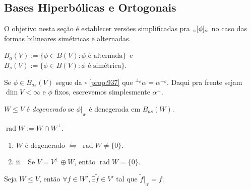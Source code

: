 \subsection{Bases Hiperbólicas e Ortogonais}

O objetivo nesta seção é establecer versões simplificadas pra \(\textcolor{gray}{_\alpha}[\phi]_\alpha\) no caso das formas bilineares simétricas e alternadas. 

\begin{definition}
    \(B_a(V):= \{\phi \in B(V): \phi \text{ é alternada}\}\)\  e \ \(B_s(V):= \{\phi \in B(V): \phi \text{ é simétrica}\}\). 
\end{definition}

\begin{note}
Se \(\phi \in B_{as}(V)\) segue da \(\square\) \ref{prop:937} que \(^{\perp_\phi}\alpha = \alpha^{\perp_\phi}\). Daqui pra frente sejam \(\dim V < \infty\) e \(\phi\) fixos, escrevemos simplesmente \(\alpha^\perp\).
\end{note}

\begin{definition}
    \(W \leq V\) é \emph{degenerado} se \(\phi|_{_W}\) é denegerada em \(B_{as}(W)\).  
\end{definition}

\newcommand{\rad}{\operatorname{rad}}
\begin{definition}
    \centering \(\rad W := W \cap W^\perp\). 
\end{definition}

\begin{lemma}
    \begin{enumerate}[label = \roman*., left = -0.3cm]
        \item \(W\) é degenerado \(\leftrightharpoons\) \(\rad W \neq \{0\}\). \comentario{\(\pt \phi|_{_W} = \dim W -\dim (\rad W)\)} 
        \item[]\hspace{-0.12cm}ii. \ Se \(V = V^\perp \oplus W\), então \(\rad W = \{0\}\). \comentario{\(\rad W \subseteq V^\perp \)}  
    \end{enumerate}
\end{lemma}

\begin{exercise}
    Seja \(W\leq V\), então \(\forall f\in W', \exists \widetilde{f} \in V'\) tal que \(\widetilde{f}|_{_W} = f \).
\end{exercise}

